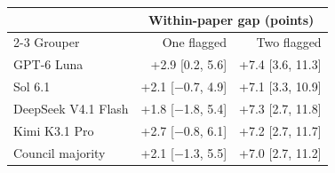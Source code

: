 \begin{tabular*}{\columnwidth}{@{\extracolsep{\fill}}lrr@{}}
\toprule
 & \multicolumn{2}{c}{Within-paper gap (points)} \\
\cmidrule(l){2-3}
Grouper & One flagged & Two flagged \\
\midrule
GPT-6 Luna & +2.9 [0.2, 5.6] & +7.4 [3.6, 11.3] \\
Sol 6.1 & +2.1 [$-$0.7, 4.9] & +7.1 [3.3, 10.9] \\
DeepSeek V4.1 Flash & +1.8 [$-$1.8, 5.4] & +7.3 [2.7, 11.8] \\
Kimi K3.1 Pro & +2.7 [$-$0.8, 6.1] & +7.2 [2.7, 11.7] \\
Council majority & +2.1 [$-$1.3, 5.5] & +7.0 [2.7, 11.2] \\
\bottomrule
\end{tabular*}
